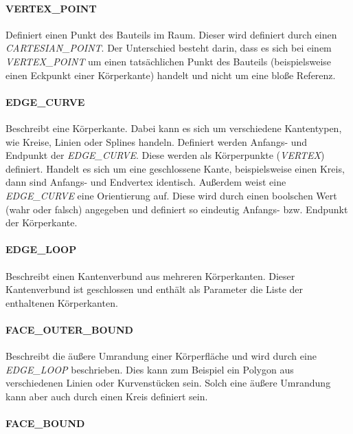 \paragraph{VERTEX\_POINT}

Definiert einen Punkt des Bauteils im Raum. Dieser wird definiert durch einen \textit{CARTESIAN\_POINT}. Der Unterschied besteht darin, dass es sich bei einem \textit{VERTEX\_POINT} um einen tatsächlichen Punkt des Bauteils (beispielsweise einen Eckpunkt einer Körperkante) handelt und nicht um eine bloße Referenz.   

\paragraph{EDGE\_CURVE}

Beschreibt eine Körperkante. Dabei kann es sich um verschiedene Kantentypen, wie Kreise, Linien oder Splines  handeln. Definiert werden Anfangs- und Endpunkt der \textit{EDGE\_CURVE}. Diese werden als Körperpunkte (\textit{VERTEX}) definiert. Handelt es sich um eine geschlossene Kante, beispielsweise einen Kreis, dann sind Anfangs- und Endvertex identisch. Außerdem weist eine \textit{EDGE\_CURVE} eine Orientierung auf. Diese wird durch einen boolschen Wert (wahr oder falsch) angegeben und definiert so eindeutig Anfangs- bzw. Endpunkt der Körperkante.   

\paragraph{EDGE\_LOOP}

Beschreibt einen Kantenverbund aus mehreren Körperkanten. Dieser Kantenverbund ist geschlossen und enthält als Parameter die Liste der enthaltenen Körperkanten. 

\paragraph{FACE\_OUTER\_BOUND}

Beschreibt die äußere Umrandung einer Körperfläche und wird durch eine \textit{EDGE\_LOOP} beschrieben. Dies kann zum Beispiel ein Polygon aus verschiedenen Linien oder Kurvenstücken sein. Solch eine äußere Umrandung kann aber auch durch einen Kreis definiert sein.

\paragraph{FACE\_BOUND}


